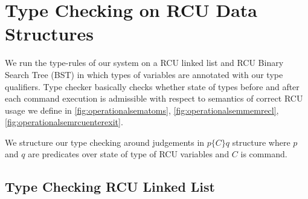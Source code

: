 \section{Type Checking on RCU Data Structures}
We run the type-rules of our system on a RCU linked list and RCU Binary Search Tree (BST) in which types of variables are annotated with our type qualifiers. Type checker basically checks whether state of types before and after each command execution is admissible with respect to semantics of correct RCU usage we define in \ref{fig:operationalsematoms}, \ref{fig:operationalsemmemrecl}, \ref{fig:operationalsemrcuenterexit}.

We structure our type checking around judgements in $p\{C\}q$ structure where $p$ and $q$ are predicates over state of type of RCU variables and $C$ is command.
\label{sec:lleval}
\subsection{Type Checking RCU Linked List}


